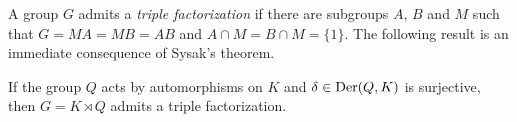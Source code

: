 A group $G$ admits a {\em triple factorization} if there are subgroups 
$A$, $B$ and $M$ such that $G=MA=MB=AB$ and $A\cap M=B\cap M=\{1\}$.
The following result is an immediate consequence of Sysak's theorem.



\begin{corollary}
	If the group $Q$ acts by automorphisms on $K$ and 
	$\delta\in\operatorname{Der}(Q,K)$ is surjective, then $G=K\rtimes Q$ admits a triple factorization. 
\end{corollary}






